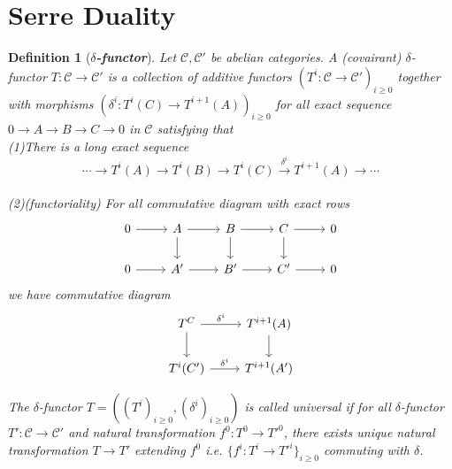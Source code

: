 \documentclass{ctexart}
\newtheorem{definition}{Definition}[section]
\begin{document}
\section{Serre Duality}
\label{section:Serre Duality}

\begin{definition}[\textbf{\emph{$\delta$-functor}}]
    Let $\mathcal{C}, \mathcal{C}'$ be abelian categories.
    A (covairant) $\delta$-functor $T: \mathcal{C} \longrightarrow \mathcal{C}'$ is a collection of additive functors $(T^{i}: \mathcal{C} \rightarrow \mathcal{C}')_{i \ge 0}$ together with morphisms $(\delta^{i}: T^{i}(C) \rightarrow T^{i + 1}(A))_{i \ge 0}$ for all exact sequence $0 \longrightarrow A \longrightarrow B \longrightarrow C \longrightarrow 0$ in $\mathcal{C}$ satisfying that \\
    (1)There is a long exact sequence 
    \begin{equation*}
        \cdots \longrightarrow T^{i}(A) \longrightarrow T^{i}(B) \longrightarrow T^{i}(C) \overset{\delta^{i}}{\longrightarrow} T^{i + 1}(A) \longrightarrow \cdots
    \end{equation*}
    \\
    (2)(functoriality)
    For all commutative diagram with exact rows
    \begin{equation*}
        \begin{tikzcd}
            0 \arrow[r] &
            A \arrow[r] \arrow[d] &
            B \arrow[r] \arrow[d] &
            C \arrow[r] \arrow[d] &
            0 \\
            0 \arrow[r] &
            A' \arrow[r] &
            B' \arrow[r] &
            C' \arrow[r] &
            0
        \end{tikzcd}
    \end{equation*}
    we have commutative diagram
    \begin{equation*}
        \begin{tikzcd}
            T^{C} \arrow[r, "\delta^{i}"] \arrow[d] &
            T^{i + 1}(A) \arrow[d] \\
            T^{i}(C') \arrow[r, "\delta^{i}"] &
            T^{i + 1}(A')
        \end{tikzcd}
    \end{equation*}
    \par
    The $\delta$-functor $T = ((T^{i})_{i \ge 0}, (\delta^{i})_{i \ge 0})$ is called universal if for all $\delta$-functor $T': \mathcal{C} \longrightarrow \mathcal{C}'$ and natural transformation $f^{0}: T^{0} \longrightarrow {T'}^{0}$,
    there exists unique natural transformation $T \longrightarrow T'$ extending $f^{0}$ i.e. $\{f^{i}: T^{i} \rightarrow {T'}^{i}\}_{i \ge 0}$ commuting with $\delta$.
\end{definition}
\end{document}
